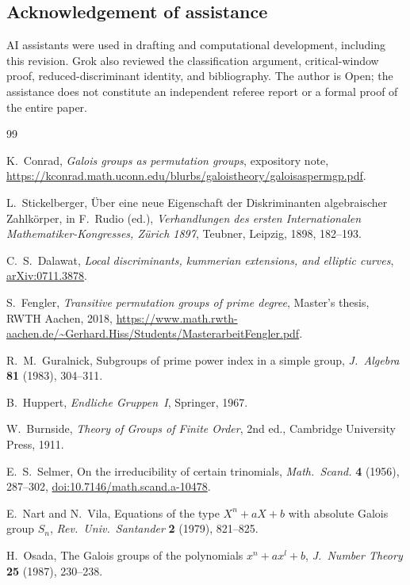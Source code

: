 \documentclass[11pt,a4paper]{amsart}
\theoremstyle{plain}
\theoremstyle{definition}
\begin{document}
\subsection*{Acknowledgement of assistance}
AI assistants were used in drafting and computational development, including this revision. Grok also reviewed the classification argument, critical-window proof, reduced-discriminant identity, and bibliography. The author is Open; the assistance does not constitute an independent referee report or a formal proof of the entire paper.

\begin{thebibliography}{99}
\raggedright
\setlength{\itemsep}{0pt}
K.~Conrad, \emph{Galois groups as permutation groups}, expository note, \url{https://kconrad.math.uconn.edu/blurbs/galoistheory/galoisaspermgp.pdf}.

L.~Stickelberger, \"Uber eine neue Eigenschaft der Diskriminanten algebraischer Zahlk\"orper, in F.~Rudio (ed.), \emph{Verhandlungen des ersten Internationalen Mathematiker-Kongresses, Z\"urich 1897}, Teubner, Leipzig, 1898, 182--193.

C.~S.~Dalawat, \emph{Local discriminants, kummerian extensions, and elliptic curves}, \href{https://arxiv.org/abs/0711.3878}{arXiv:0711.3878}.

S.~Fengler, \emph{Transitive permutation groups of prime degree}, Master's thesis, RWTH Aachen, 2018, \url{https://www.math.rwth-aachen.de/~Gerhard.Hiss/Students/MasterarbeitFengler.pdf}.

R.~M.~Guralnick, Subgroups of prime power index in a simple group, \emph{J.\ Algebra} \textbf{81} (1983), 304--311.

B.~Huppert, \emph{Endliche Gruppen~I}, Springer, 1967.

W.~Burnside, \emph{Theory of Groups of Finite Order}, 2nd ed., Cambridge University Press, 1911.

E.~S.~Selmer, On the irreducibility of certain trinomials, \emph{Math.\ Scand.} \textbf{4} (1956), 287--302, \href{https://doi.org/10.7146/math.scand.a-10478}{doi:10.7146/math.scand.a-10478}.

E.~Nart and N.~Vila, Equations of the type \(X^n+aX+b\) with absolute Galois group \(S_n\), \emph{Rev.\ Univ.\ Santander} \textbf{2} (1979), 821--825.

H.~Osada, The Galois groups of the polynomials \(x^n+ax^l+b\), \emph{J.\ Number Theory} \textbf{25} (1987), 230--238.


\end{thebibliography}
\end{document}
